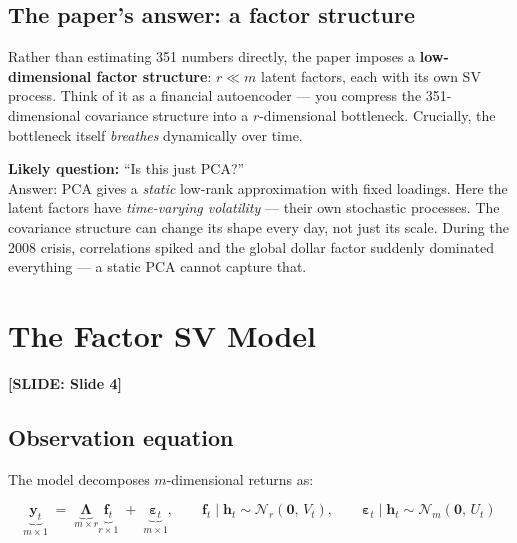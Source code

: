 \documentclass[11pt, a4paper]{article}\usepackage[]{graphicx}\usepackage[]{xcolor}
\newcommand{\slidetag}[1]{%
  \noindent\textcolor{MainBlue}{\footnotesize\textbf{[SLIDE: #1]}}%
  \vspace{0.2em}\par
}
\newcommand{\stress}[1]{\textbf{#1}}
\begin{document}
\subsection{The paper's answer: a factor structure}

Rather than estimating 351 numbers directly, the paper imposes a
\stress{low-dimensional factor structure}: $r \ll m$ latent factors, each with
its own SV process.  Think of it as a financial autoencoder --- you compress
the 351-dimensional covariance structure into a $r$-dimensional bottleneck.
Crucially, the bottleneck itself \textit{breathes} dynamically over time.

\begin{remarkbox}
  \textbf{Likely question:} ``Is this just PCA?''\\
  Answer: PCA gives a \textit{static} low-rank approximation with fixed loadings.
  Here the latent factors have \textit{time-varying volatility} --- their own
  stochastic processes.  The covariance structure can change its shape every
  day, not just its scale.  During the 2008 crisis, correlations spiked and
  the global dollar factor suddenly dominated everything --- a static PCA
  cannot capture that.
\end{remarkbox}

\section{The Factor SV Model}

\slidetag{Slide 4}

\subsection{Observation equation}

The model decomposes $m$-dimensional returns as:

\begin{formulabox}
\[
  \underbrace{\mathbf{y}_t}_{m \times 1}
  \;=\;
  \underbrace{\boldsymbol{\Lambda}}_{m \times r}
  \underbrace{\mathbf{f}_t}_{r \times 1}
  \;+\;
  \underbrace{\boldsymbol{\varepsilon}_t}_{m \times 1},
  \qquad
  \mathbf{f}_t \mid \mathbf{h}_t \sim \mathcal{N}_r(\mathbf{0},\, V_t),
  \qquad
  \boldsymbol{\varepsilon}_t \mid \mathbf{h}_t \sim \mathcal{N}_m(\mathbf{0},\, U_t)
\]
\end{formulabox}
\end{document}
